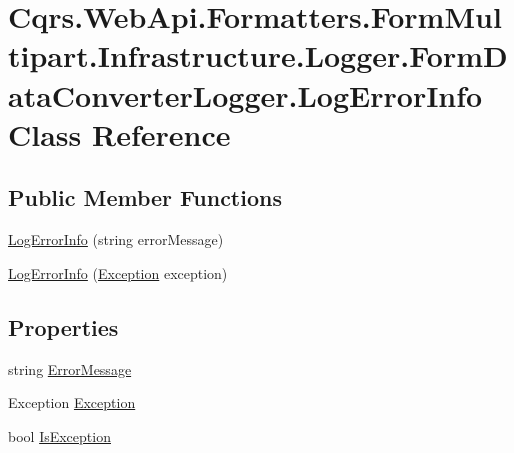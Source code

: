 \hypertarget{classCqrs_1_1WebApi_1_1Formatters_1_1FormMultipart_1_1Infrastructure_1_1Logger_1_1FormDataConverterLogger_1_1LogErrorInfo}{}\section{Cqrs.\+Web\+Api.\+Formatters.\+Form\+Multipart.\+Infrastructure.\+Logger.\+Form\+Data\+Converter\+Logger.\+Log\+Error\+Info Class Reference}
\label{classCqrs_1_1WebApi_1_1Formatters_1_1FormMultipart_1_1Infrastructure_1_1Logger_1_1FormDataConverterLogger_1_1LogErrorInfo}
\subsection*{Public Member Functions}
\begin{DoxyCompactItemize}
\item 
\hyperlink{classCqrs_1_1WebApi_1_1Formatters_1_1FormMultipart_1_1Infrastructure_1_1Logger_1_1FormDataConverterLogger_1_1LogErrorInfo_a31916a55289297f7efaa60610ae7c709_a31916a55289297f7efaa60610ae7c709}{Log\+Error\+Info} (string error\+Message)
\item 
\hyperlink{classCqrs_1_1WebApi_1_1Formatters_1_1FormMultipart_1_1Infrastructure_1_1Logger_1_1FormDataConverterLogger_1_1LogErrorInfo_a33f68203e91f1553c46ba09a41341714_a33f68203e91f1553c46ba09a41341714}{Log\+Error\+Info} (\hyperlink{classCqrs_1_1WebApi_1_1Formatters_1_1FormMultipart_1_1Infrastructure_1_1Logger_1_1FormDataConverterLogger_1_1LogErrorInfo_aca090100f80122a6a5ae5aa930f49e9b_aca090100f80122a6a5ae5aa930f49e9b}{Exception} exception)
\end{DoxyCompactItemize}
\subsection*{Properties}
\begin{DoxyCompactItemize}
\item 
string \hyperlink{classCqrs_1_1WebApi_1_1Formatters_1_1FormMultipart_1_1Infrastructure_1_1Logger_1_1FormDataConverterLogger_1_1LogErrorInfo_a823669153ba414c8e18a7570665c9331_a823669153ba414c8e18a7570665c9331}{Error\+Message}
\item 
Exception \hyperlink{classCqrs_1_1WebApi_1_1Formatters_1_1FormMultipart_1_1Infrastructure_1_1Logger_1_1FormDataConverterLogger_1_1LogErrorInfo_aca090100f80122a6a5ae5aa930f49e9b_aca090100f80122a6a5ae5aa930f49e9b}{Exception}
\item 
bool \hyperlink{classCqrs_1_1WebApi_1_1Formatters_1_1FormMultipart_1_1Infrastructure_1_1Logger_1_1FormDataConverterLogger_1_1LogErrorInfo_aea6dad38c7378ec2aa015c244924ec3b_aea6dad38c7378ec2aa015c244924ec3b}{Is\+Exception}
\end{DoxyCompactItemize}


